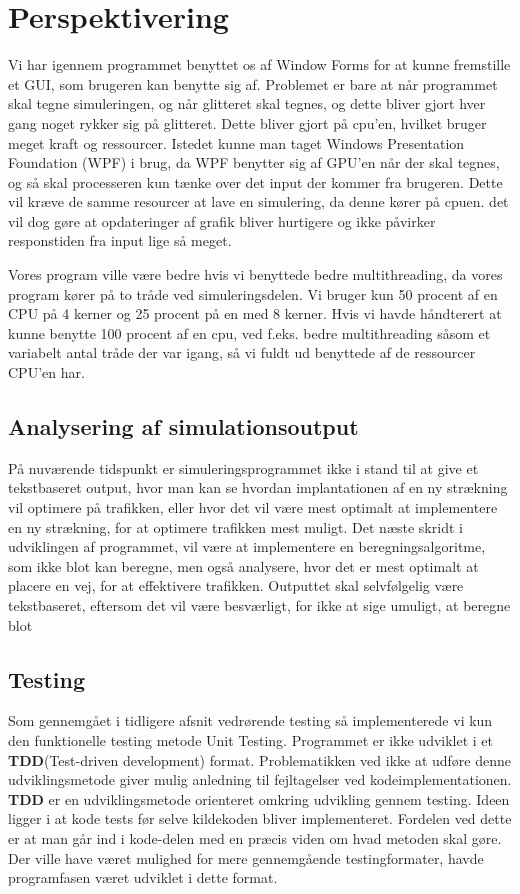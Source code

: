 \chapter{Perspektivering}\label{Perspektivering}
Vi har igennem programmet benyttet os af Window Forms for at kunne fremstille et GUI, som brugeren kan benytte sig af. Problemet er bare at når programmet skal tegne simuleringen, og når glitteret skal tegnes, og dette bliver gjort hver gang noget rykker sig på glitteret. Dette bliver gjort på cpu'en, hvilket bruger meget kraft og ressourcer. Istedet kunne man taget Windows Presentation Foundation (WPF) i brug, da WPF benytter sig af GPU'en når der skal tegnes, og så skal processeren kun tænke over det input der kommer fra brugeren. Dette vil kræve de samme resourcer at lave en simulering, da denne kører på cpuen. det vil dog gøre at opdateringer af grafik bliver hurtigere og ikke påvirker responstiden fra input lige så meget.

\vspace{5mm}

Vores program ville være bedre hvis vi benyttede bedre multithreading, da vores program kører på to tråde ved simuleringsdelen. Vi bruger kun 50 procent af en CPU på 4 kerner og 25 procent på en med 8 kerner. Hvis vi havde håndterert at kunne benytte 100 procent af en cpu, ved f.eks. bedre multithreading såsom et variabelt antal tråde der var igang, så vi fuldt ud benyttede af de ressourcer CPU'en har.

\section{Analysering af simulationsoutput}
På nuværende tidspunkt er simuleringsprogrammet ikke i stand til at give et tekstbaseret output, hvor man kan se hvordan implantationen af en ny strækning vil optimere på trafikken, eller hvor det vil være mest optimalt at implementere en ny strækning, for at optimere trafikken mest muligt. Det næste skridt i udviklingen af programmet, vil være at implementere en beregningsalgoritme, som ikke blot kan beregne, men også analysere, hvor det er mest optimalt at placere en vej, for at effektivere trafikken. Outputtet skal selvfølgelig være tekstbaseret, eftersom det vil være besværligt, for ikke at sige umuligt, at beregne blot 

\section{Testing}
Som gennemgået i tidligere afsnit vedrørende testing så implementerede vi kun den funktionelle testing metode Unit Testing. Programmet er ikke udviklet i et \textbf{TDD}(Test-driven development) format. Problematikken ved ikke at udføre denne udviklingsmetode giver mulig anledning til fejltagelser ved kodeimplementationen. \textbf{TDD} er en udviklingsmetode orienteret omkring udvikling gennem testing. Ideen ligger i at kode tests før selve kildekoden bliver implementeret. Fordelen ved dette er at man går ind i kode-delen med en præcis viden om hvad metoden skal gøre.\cite{unittestbenefits}
Der ville have været mulighed for mere gennemgående testingformater, havde programfasen været udviklet i dette format.

